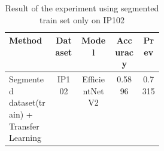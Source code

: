 \begin{table}[!htbp]
\centering
\begin{tabular}{|p{0.3\linewidth}|c|c|c|c|}
\hline
\textbf{Method} & \textbf{Dataset} & \textbf{Model} & \textbf{Accuracy} & \textbf{Prev}\\
\hline
Segmented dataset(train) + Transfer Learning & IP102 & EfficientNetV2 & 0.5896 & 0.7315\\
\hline
\end{tabular}
\caption{Result of the experiment using segmented train set only on IP102}
\end{table}